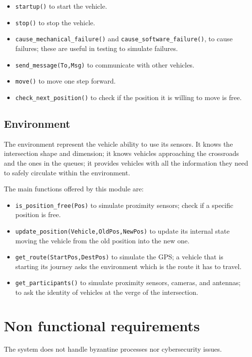 \documentclass{memoir}
\begin{document}
\begin{itemize}
	\item \texttt{startup()} to start the vehicle.
	\item \texttt{stop()} to stop the vehicle.
	\item \texttt{cause\_mechanical\_failure()} and \texttt{cause\_software\_failure()}, to cause failures; these are useful in testing to simulate failures.
	\item \texttt{send\_message(To,Msg)} to communicate with other vehicles.
	\item \texttt{move()} to move one step forward.
	\item \texttt{check\_next\_position()} to check if the position it is willing to move is free.
\end{itemize}


\subsection{Environment}
The environment represent the vehicle ability to use its sensors. It knows the intersection shape and dimension; it knows vehicles approaching the crossroads and the ones in the queues; it provides vehicles with all the information they need to safely circulate within the environment.

The main functions offered by this module are:

\begin{itemize}
	\item \texttt{is\_position\_free(Pos)} to simulate proximity sensors; check if a specific position is free.
	\item \texttt{update\_position(Vehicle,OldPos,NewPos)} to update its internal state moving the vehicle from the old position into the new one.
	\item \texttt{get\_route(StartPos,DestPos)} to simulate the GPS; a vehicle that is starting its journey asks the environment which is the route it has to travel.
	\item \texttt{get\_participants()} to simulate proximity sensors, cameras, and antennas; to ask the identity of vehicles at the verge of the intersection. 
\end{itemize}

\section{Non functional requirements}
The system does not handle byzantine processes nor cybersecurity issues.
\end{document}

